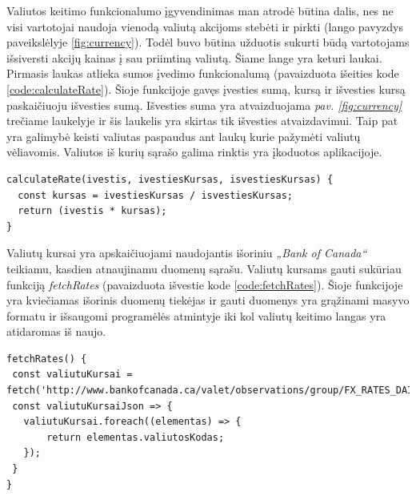 \documentclass[a4paper,12pt,fleqn]{article}
\begin{document}
Valiutos keitimo funkcionalumo įgyvendinimas man atrodė būtina dalis, nes ne visi vartotojai naudoja vienodą valiutą akcijoms stebėti ir pirkti (lango pavyzdys paveikslėlyje \ref{fig:currency}). Todėl buvo būtina užduotis sukurti būdą vartotojams išsiversti akcijų kainas į sau priimtiną valiutą. Šiame lange yra keturi laukai. Pirmasis laukas atlieka sumos įvedimo funkcionalumą (pavaizduota išeities kode \ref{code:calculateRate}). Šioje funkcijoje gavęs įvesties sumą, kursą ir išvesties kursą paskaičiuoju išvesties sumą. Išvesties suma yra atvaizduojama \textit{pav. \ref{fig:currency}} trečiame laukelyje ir šis laukelis yra skirtas tik išvesties atvaizdavimui. Taip pat yra galimybė keisti valiutas paspaudus ant laukų kurie pažymėti valiutų vėliavomis. Valiutos iš kurių sąrašo galima rinktis yra įkoduotos aplikacijoje.

\begin{lstlisting}[caption={Funkcijos calculateRate() pseudokodas.},label={code:calculateRate}]
calculateRate(ivestis, ivestiesKursas, isvestiesKursas) {
  const kursas = ivestiesKursas / isvestiesKursas;
  return (ivestis * kursas);
}
\end{lstlisting}

Valiutų kursai yra apskaičiuojami naudojantis išoriniu \textit{„Bank of Canada“} teikiamu, kasdien atnaujinamu duomenų sąrašu. Valiutų kursams gauti sukūriau funkciją \textit{fetchRates} (pavaizduota išvestie kode \ref{code:fetchRates}). Šioje funkcijoje yra kviečiamas išorinis duomenų tiekėjas ir gauti duomenys yra grąžinami masyvo formatu ir išsaugomi programėlės atmintyje iki kol valiutų keitimo langas yra atidaromas iš naujo.

\begin{lstlisting}[caption={Funkcijos fetchRates() pseudokodas.},label={code:fetchRates}]
fetchRates() {
 const valiutuKursai = fetch('http://www.bankofcanada.ca/valet/observations/group/FX_RATES_DAILY');
 const valiutuKursaiJson => {
   valiutuKursai.foreach((elementas) => {
	   return elementas.valiutosKodas;
   });
 }
}
\end{lstlisting}



\end{document}

